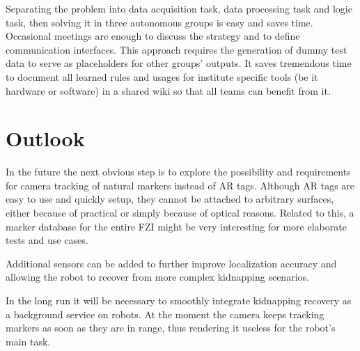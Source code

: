 Separating the problem into data acquisition task, data processing task and logic task, then solving it in three autonomous groups is easy and saves time. Occasional meetings are enough to discuss the strategy and to define communication interfaces. This approach requires the generation of dummy test data to serve as placeholders for other groups' outputs. It saves tremendous time to document all learned rules and usages for institute specific tools (be it hardware or software) in a shared wiki so that all teams can benefit from it.

\section{Outlook}
In the future the next obvious step is to explore the possibility and requirements for camera tracking of natural markers instead of AR tags. Although AR tags are easy to use and quickly setup, they cannot be attached to arbitrary surfaces, either because of practical or simply because of optical reasons. Related to this, a marker database for the entire FZI might be very interesting for more elaborate tests and use cases.

Additional sensors can be added to further improve localization accuracy and allowing the robot to recover from more complex kidnapping scenarios.

In the long run it will be necessary to smoothly integrate kidnapping recovery as a background service on robots. At the moment the camera keeps tracking markers as soon as they are in range, thus rendering it useless for the robot's main task.